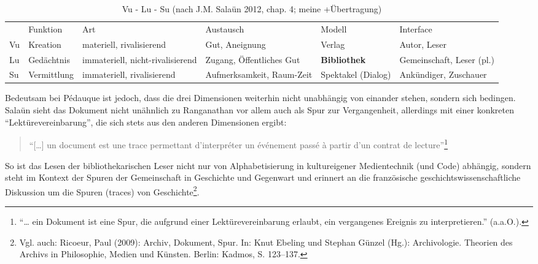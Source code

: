 \begin{table}
\small
\begin{tabular}{p{0.5cm}p{1.5cm}p{2cm}p{3cm}p{1.5cm}p{2cm}}
 \toprule
 & Funktion & Art & Austausch & Modell & Interface \\
 \cmidrule(r){1-1} \cmidrule(r){2-2} \cmidrule(r){3-3} \cmidrule(r){4-4} \cmidrule(r){5-5} \cmidrule(r){6-6}
 Vu & Kreation & materiell, rivalisierend & Gut, Aneignung & Verlag &
 Autor, Leser\\
 Lu & Gedächtnis & immateriell, nicht-rivali\-sierend & Zugang,
 Öffentliches Gut & \textbf{Bibliothek} & Gemeinschaft, Leser
 (pl.)\\
 Su & Vermittlung & immateriell, rivalisierend & Aufmerksamkeit,
 Raum-Zeit & Spektakel (Dialog) & Ankündiger, Zuschauer\\
 \cmidrule(r){1-1} \cmidrule(r){2-2} \cmidrule(r){3-3} \cmidrule(r){4-4} \cmidrule(r){5-5} \cmidrule(r){6-6}
 \bottomrule
 \end{tabular}
 \caption{Vu - Lu - Su (nach J.M. Salaün 2012, chap. 4; meine
 +Übertragung)}
 \end{table}
 
Bedeutsam bei Pédauque ist jedoch, dass die drei Dimensionen weiterhin
nicht unabhängig von einander stehen, sondern sich bedingen. Salaün
sieht das Dokument nicht unähnlich zu Ranganathan vor allem auch als
Spur zur Vergangenheit, allerdings mit einer konkreten
\enquote{Lektürevereinbarung}, die sich stets aus den anderen
Dimensionen ergibt:

\begin{quote}
\enquote{{[}\ldots{}{]} un document est une trace permettant
d'interpréter un événement passé à partir d'un contrat de
lecture}\footnote{\enquote{\ldots{} ein Dokument ist eine Spur, die
  aufgrund einer Lektürevereinbarung erlaubt, ein vergangenes Ereignis
  zu interpretieren.} (a.a.O.).}
\end{quote}

So ist das Lesen der bibliothekarischen Leser nicht nur von
Alphabetisierung in kultureigener Medientechnik (und Code) abhängig,
sondern steht im Kontext der Spuren der Gemeinschaft in Geschichte und
Gegenwart und erinnert an die französische geschichtswissenschaftliche
Diskussion um die Spuren (traces) von Geschichte\footnote{Vgl. auch:
  Ricoeur, Paul (2009): Archiv, Dokument, Spur. In: Knut Ebeling und
  Stephan Günzel (Hg.): Archivologie. Theorien des Archivs in
  Philosophie, Medien und Künsten. Berlin: Kadmos, S. 123--137.}.

